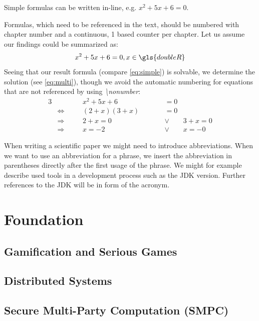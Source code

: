 Simple formulas can be written in-line, e.g. \(x^2+5x+6=0\).
\begin{samepage}
	 Formulas, which need to be referenced in the text, should be numbered with chapter number and a continuous, 1 based counter per chapter. Let us assume our findings could be summarized as:
	\nopagebreak
	\begin{equation}
		\label{eq:simple}
		x^2+5x+6=0, x \in \gls{doubleR}
	\end{equation}
	Seeing that our result formula (compare \ref{eq:simple}) is solvable, we determine the solution (see \ref{eq:multi}), though we avoid the automatic numbering for equations that are not referenced by using \textit{\textbackslash nonumber}:
	\nopagebreak
	\begin{alignat}{3}
		& \quad && x^2+5x+6                   \qquad && = 0  \nonumber \\
		& \Leftrightarrow \quad && (2+x)(3+x) \qquad && = 0 \nonumber \\
		& \Rightarrow     \quad && 2+x=0      \qquad && \lor \qquad 3+x=0 \nonumber \\
		& \Rightarrow 	  \quad && x=-2       \qquad && \lor \qquad x =-0 \label{eq:multi} 
	\end{alignat}
\end{samepage}

When writing a scientific paper we might need to introduce abbreviations. When we want to use an abbreviation for a phrase, we insert the abbreviation in parentheses directly after the first usage of the phrase. We might for example describe used tools in a development process such as the \gls{JDK} version. Further references to the \gls{JDK} will be in form of the acronym.\par



\par
\lipsum[1-3]

\chapter{Foundation}
	\section{Gamification and Serious Games}
	\section{Distributed Systems}
	\section{Secure Multi-Party Computation (SMPC)}
